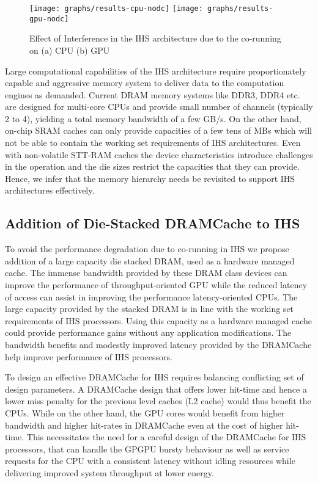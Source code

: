 \begin{figure}[htb]
	\centering
	\texttt{[image: graphs/results-cpu-nodc]}
	\texttt{[image: graphs/results-gpu-nodc]}
	\caption{Effect of Interference in the IHS architecture due to the co-running on (a) CPU (b) GPU}
	\label{results-interference}
\end{figure}

\par Large computational capabilities of the IHS architecture require proportionately capable and aggressive memory system to deliver data to the computation engines as demanded. Current DRAM memory systems like DDR3, DDR4 etc. are designed for multi-core CPUs and provide small number of channels (typically 2 to 4), yielding a total memory bandwidth of a few GB/s. On the other hand, on-chip SRAM caches can only provide capacities of a few tens of MBs which will not be able to contain the working set requirements of IHS architectures. Even with non-volatile STT-RAM caches the device characteristics introduce challenges in the operation and the die sizes restrict the capacities that they can provide. Hence, we infer that the memory hierarchy needs be revisited to support IHS architectures effectively.


\subsection{Addition of Die-Stacked DRAMCache to IHS}
To avoid the performance degradation due to co-running in IHS we propose addition of a large capacity die stacked DRAM, used as a hardware managed cache. The immense bandwidth provided by these DRAM class devices can improve the performance of throughput-oriented GPU while the reduced latency of access can assist in improving the performance latency-oriented CPUs. The large capacity provided by the stacked DRAM is in line with the working set requirements of IHS processors. Using this capacity as a hardware managed cache could provide performance gains without any application modifications. The bandwidth benefits and modestly improved latency provided by the DRAMCache help improve performance of IHS processors. 
\par To design an effective DRAMCache for IHS requires balancing conflicting set of design parameters. A DRAMCache design that offers lower hit-time and hence a lower miss penalty for the previous level caches (L2 cache) would thus benefit the CPUs. While on the other hand, the GPU cores would benefit from higher bandwidth and higher hit-rates in DRAMCache even at the cost of higher hit-time. This necessitates the need for a careful design of the DRAMCache for IHS processors, that can handle the GPGPU bursty behaviour as well as service requests for the CPU with a consistent latency without idling resources while delivering improved system throughput at lower energy.

